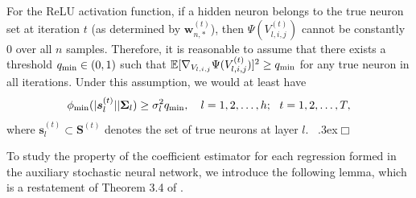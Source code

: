 \documentclass[11pt]{article}
\newcommand{\bw}{{\boldsymbol w}}
\newcommand{\bs}{{\boldsymbol s}}
\newcommand{\bS}{{\boldsymbol S}}
\newcommand{\bSigma}{{\boldsymbol \Sigma}}
\newenvironment{proof}{\trivlist\item[\hskip \labelsep{\sc Proof:}]}
 {\unskip\nobreak\ \lower.3ex\hbox{$\Box$}\endtrivlist}
\begin{document}
\begin{proof}
For the ReLU activation function, if a hidden neuron belongs to the true neuron set at iteration $t$ (as determined by $\bw_{n,*}^{(t)}$), 
then $\Psi(V_{l,i,j}^{(t)})$ cannot be constantly 0 over all $n$ samples.
Therefore, it is reasonable to assume that there exists a 
threshold $q_{\rm min} \in (0,1)$ such that $\mathbb{E}[\nabla_{V_{l,i,j}} \Psi(V_{l,i,j}^{(t)})]^2 \geq q_{\rm min}$ for any true neuron in all iterations.
Under this assumption, we would at least have 
\[
\phi_{\rm min}(|\bs_l^{(t)}| | \bSigma_l) \geq \sigma_{l}^2 q_{\rm min},  \quad l=1,2,\ldots,h; \ \ t=1,2,\ldots, T, 
\]
where $\bs_l^{(t)} \subset \bS^{(t)}$ denotes the set of true neurons at layer $l$. 
\end{proof}

 
To study the property of the coefficient estimator for each regression formed 
in the auxiliary stochastic neural network, we introduce the following 
lemma, which is a restatement of Theorem 3.4 of \cite{SongLiang2021Nearly}. 
\end{document}
